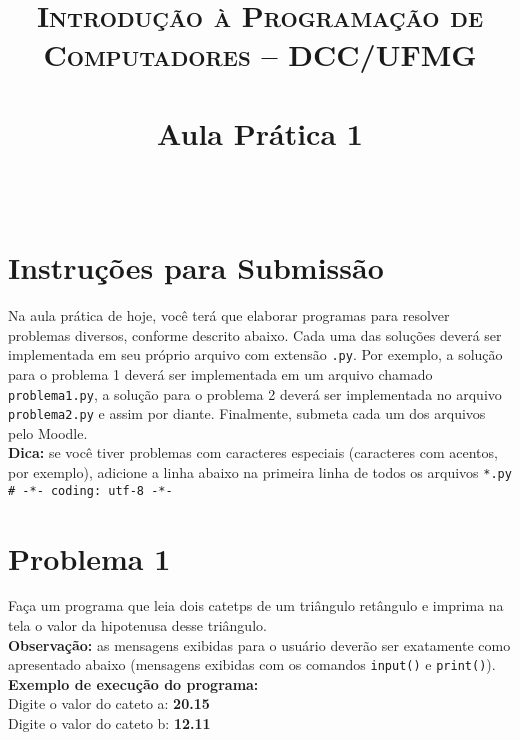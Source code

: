 \documentclass[paper=a4, fontsize=11pt]{scrartcl} %
\title{	
\normalfont \normalsize 
\textsc{Introdução à Programação de Computadores -- DCC/UFMG} \\ [25pt] %
\horrule{2pt} \\[0.4cm] %
\huge Aula Prática 1 \\ %
\vspace{0.25cm}
\horrule{2pt} \\[0.5cm] %
}
\date{}
\numberwithin{equation}{section} %
\numberwithin{figure}{section} %
\numberwithin{table}{section} %
\begin{document}
\maketitle %



\small
\section*{Instruções para Submissão}

Na aula prática de hoje, você terá que elaborar programas para resolver problemas diversos, conforme descrito abaixo. Cada uma das soluções deverá ser implementada em seu próprio arquivo com extensão \texttt{.py}. Por exemplo, a solução para o problema 1 deverá ser implementada em um arquivo chamado \texttt{problema1.py}, a solução para o problema 2 deverá ser implementada no arquivo \texttt{problema2.py} e assim por diante. Finalmente, submeta cada um dos arquivos pelo Moodle.\\

\textbf{Dica:} se você tiver problemas com caracteres especiais (caracteres com acentos, por exemplo), adicione a linha abaixo na primeira linha de todos os arquivos \texttt{*.py}\\

\texttt{\# -*- coding: utf-8 -*-}




\section*{Problema 1}

Faça um programa que leia dois catetps de um triângulo retângulo e imprima na tela o valor da hipotenusa desse triângulo.\\

\textbf{Observação:} as mensagens exibidas para o usuário deverão ser exatamente como apresentado abaixo (mensagens exibidas com os comandos \texttt{input()} e \texttt{print()}).\\


\textbf{Exemplo de execução do programa:}\\

Digite o valor do cateto a: \textbf{20.15} \\
Digite o valor do cateto b: \textbf{12.11} \\
\end{document}
